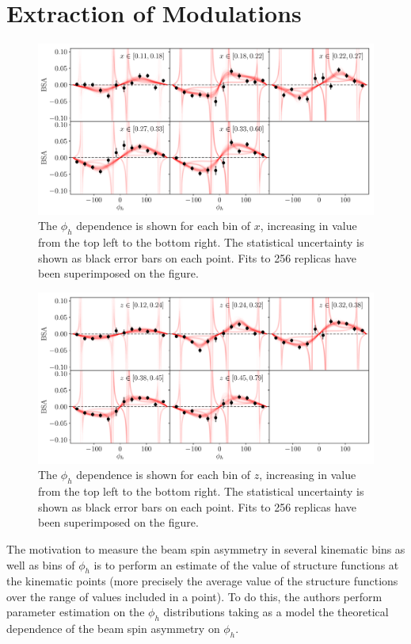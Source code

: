 \section{Extraction of Modulations}

\begin{figure}
	\centering
	\label{fig:replicas-x}
	\includegraphics[width=\textwidth]{image/plots/kaon-bsa/grid_bsa_reps_x.pdf}
	\caption{The $\phi_h$ dependence is shown for each bin of $x$, increasing in value from the top left to the bottom right.  The statistical uncertainty is shown as black error bars on each point.  Fits to 256 replicas have been superimposed on the figure.}
\end{figure}

\begin{figure}
	\centering
	\label{fig:replicas-z}
	\includegraphics[width=\textwidth]{image/plots/kaon-bsa/grid_bsa_reps_z.pdf}
	\caption{The $\phi_h$ dependence is shown for each bin of $z$, increasing in value from the top left to the bottom right.  The statistical uncertainty is shown as black error bars on each point.  Fits to 256 replicas have been superimposed on the figure.}
\end{figure}

The motivation to measure the beam spin asymmetry in several kinematic bins as well as bins of $\phi_{h}$ is to perform an estimate of the value of structure functions at the kinematic points (more precisely the average value of the structure functions over the range of values included in a point).  To do this, the authors perform parameter estimation on the $\phi_{h}$ distributions taking as a model the theoretical dependence of the beam spin asymmetry on $\phi_{h}$.

